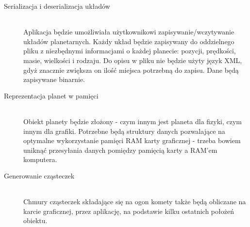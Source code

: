 \begin{description}
	\item[Serializacja i deserializacja układów] \hfill \\
	Aplikacja będzie umożliwiała użytkownikowi zapisywanie/wczytywanie układów planetarnych. Każdy układ będzie zapisywany do oddzielnego pliku z niezbędnymi informacjami o każdej planecie: pozycji, prędkości, masie, wielkości i rodzaju. Do opisu w pliku nie będzie użyty język XML, gdyż znacznie zwiększa on ilość miejsca potrzebną do zapisu. Dane będą zapisywane binarnie.
	\item[Reprezentacja planet w pamięci] \hfill \\
	Obiekt planety będzie złożony - czym innym jest planeta dla fizyki, czym innym dla grafiki. Potrzebne będą struktury danych pozwalające na optymalne wykorzystanie pamięci RAM karty graficznej - trzeba bowiem uniknąć przesyłania danych pomiędzy pamięcią karty a RAM'em komputera.
	\item[Generowanie cząsteczek] \hfill \\
	Chmury cząsteczek składające się na ogon komety także będą obliczane na karcie graficznej, przez aplikację, na podstawie kilku ostatnich położeń obiektu.
\end{description}
